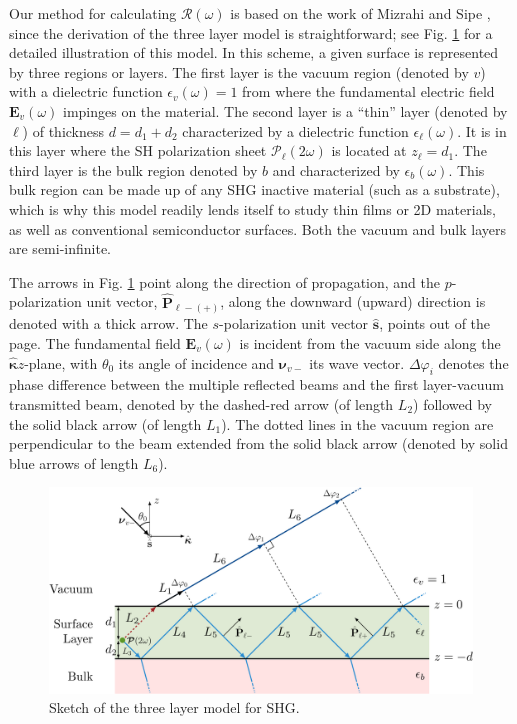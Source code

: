 \documentclass[aps,pra,10pt,amsmath,twocolumn,letterpaper]{revtex4-1}
\begin{document}
Our method for calculating $\mathcal{R}(\omega)$ is based on the work of Mizrahi
and Sipe \cite{mizrahiJOSA88}, since the derivation of the three layer model is
straightforward; see Fig. \ref{fig:MR3layer2w} for a detailed illustration of
this model. In this scheme, a given surface is represented by three regions or
layers. The first layer is the vacuum region (denoted by $v$) with a dielectric
function $\epsilon_{v}(\omega)=1$ from where the fundamental electric field
$\mathbf{E}_{v}(\omega)$ impinges on the material. The second layer is a
``thin'' layer (denoted by $\ell$) of thickness $d = d_{1} + d_{2}$
characterized by a dielectric function $\epsilon_{\ell}(\omega)$. It is in this
layer where the SH polarization sheet $\boldsymbol{\mathcal{P}}_{\ell}(2\omega)$
is located at $z_{\ell} = d_{1}$. The third layer is the bulk region denoted by
$b$ and characterized by $\epsilon_{b}(\omega)$. This bulk region can be made up
of any SHG inactive material (such as a substrate), which is why this model
readily lends itself to study thin films or 2D materials, as well as
conventional semiconductor surfaces. Both the vacuum and bulk layers are
semi-infinite.

The arrows in Fig. \ref{fig:MR3layer2w} point along the direction of
propagation, and the $p$-polarization unit vector, $\hat{\mathbf{P}}_{\ell
-(+)}$, along the downward (upward) direction is denoted with a thick arrow. The
$s$-polarization unit vector $\hat{\mathbf{s}}$, points out of the page. The
fundamental field $\mathbf{E}_{v}(\omega)$ is incident from the vacuum side
along the $\hat{\boldsymbol{\kappa}}z$-plane, with $\theta_{0}$ its angle of
incidence and $\boldsymbol{\nu}_{v-}$ its wave vector. $\Delta\varphi_{i}$
denotes the phase difference between the multiple reflected beams and the first
layer-vacuum transmitted beam, denoted by the dashed-red arrow (of length
$L_{2}$) followed by the solid black arrow (of length $L_{1}$). The dotted lines
in the vacuum region are perpendicular to the beam extended from the solid black
arrow (denoted by solid blue arrows of length $L_{6}$).

\begin{figure}[b]
\centering 
\includegraphics[width=\linewidth]{diag-3layer_MR_2w}
\caption{Sketch of the three layer model for SHG.}
\label{fig:MR3layer2w}
\end{figure}
\end{document}
